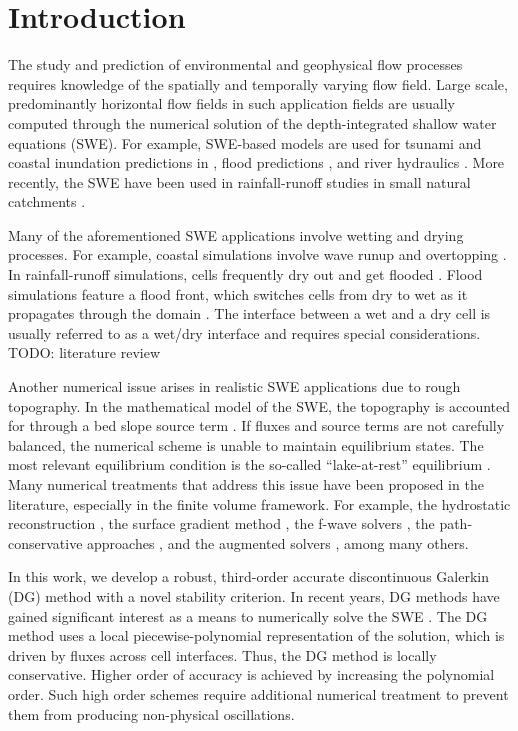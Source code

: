 \section{Introduction}

The study and prediction of environmental and geophysical flow
processes requires knowledge of the spatially and temporally varying
flow field.  Large scale, predominantly horizontal flow fields in such
application fields are usually computed through the numerical solution
of the depth-integrated shallow water equations (SWE).  For example,
SWE-based models are used for tsunami and coastal inundation
predictions in \cite{Marras:2016, Vater2019, Qin:2019}, flood
predictions \cite{George2011, Echeverribar2019}, and river hydraulics
\cite{Persi:2019}.  More recently, the SWE have been used in
rainfall-runoff studies in small natural catchments \cite{Mugler2011,
  Lacasta2014, Simons2014, Xia2019, CaviedesVoullieme2020}.

Many of the aforementioned SWE applications involve wetting and drying
processes.  For example, coastal simulations involve wave runup and
overtopping \cite{Vater20151, Medeiros2013, Vater2019}. In
rainfall-runoff simulations, cells frequently dry out and get flooded
\cite{Simons2014, Lacasta2014, Xia2017}. Flood simulations feature a
flood front, which switches cells from dry to wet as it propagates
through the domain \cite{George2011}.  The interface between a wet and
a dry cell is usually referred to as a wet/dry interface
\cite{Bollermann2013, Beisiegel2015} and requires special
considerations. TODO: literature review

Another numerical issue arises in realistic SWE applications due to
rough topography.  In the mathematical model of the SWE, the
topography is accounted for through a bed slope source term
\cite{Kesserwani2013}.  If fluxes and source terms are not carefully
balanced, the numerical scheme is unable to maintain equilibrium
states.  The most relevant equilibrium condition is the so-called
``lake-at-rest'' equilibrium \cite{bermude2}.  Many numerical
treatments that address this issue have been proposed in the
literature, especially in the finite volume framework.  For example,
the hydrostatic reconstruction \cite{audusse}, the surface gradient
method \cite{zhou}, the f-wave solvers \cite{George:2008,
  LeVeque:2011}, the path-conservative approaches \cite{Gosse:2001,
  LeVeque:2011}, and the augmented solvers \cite{NavasMontilla2020},
among many others.

In this work, we develop a robust, third-order accurate discontinuous
Galerkin (DG) method with a novel stability criterion. In recent
years, DG methods have gained significant interest as a means to
numerically solve the SWE \cite{CaviedesVoullieme2015, kesserwani2015,
  Vater20151, Marras:2016, Kesserwani2019, Vater2019,
  CaviedesVoullieme2020, NavasMontilla2020}.  The DG method uses a
local piecewise-polynomial representation of the solution, which is
driven by fluxes across cell interfaces.  Thus, the DG method is
locally conservative.  Higher order of accuracy is achieved by
increasing the polynomial order.  Such high order schemes require
additional numerical treatment to prevent them from producing
non-physical oscillations.

